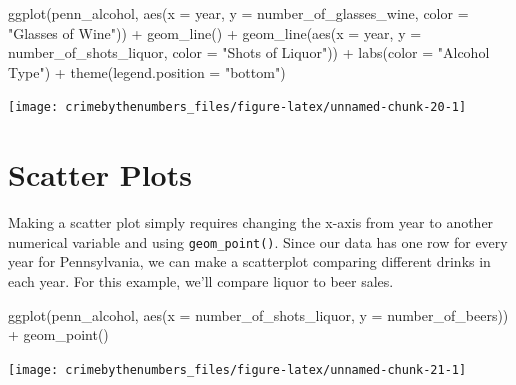 \documentclass[
]{krantz}
\makeatletter
\newenvironment{Shaded}{\begin{snugshade}}{\end{snugshade}}
\newcommand{\AttributeTok}[1]{\textcolor[rgb]{0.61,0.61,0.61}{#1}}
\newcommand{\FunctionTok}[1]{\textcolor[rgb]{0,0,0}{#1}}
\newcommand{\NormalTok}[1]{#1}
\newcommand{\SpecialCharTok}[1]{\textcolor[rgb]{0,0,0}{#1}}
\newcommand{\StringTok}[1]{\textcolor[rgb]{0.5,0.5,0.5}{#1}}
\newenvironment{kframe}{%
\medskip{}
\setlength{\fboxsep}{.8em}
 \def\at@end@of@kframe{}%
 \ifinner\ifhmode%
  \def\at@end@of@kframe{\end{minipage}}%
  \begin{minipage}{\columnwidth}%
 \fi\fi%
 \def\FrameCommand##1{\hskip\@totalleftmargin \hskip-\fboxsep
 \colorbox{shadecolor}{##1}\hskip-\fboxsep
     \hskip-\linewidth \hskip-\@totalleftmargin \hskip\columnwidth}%
 \MakeFramed {\advance\hsize-\width
   \@totalleftmargin\z@ \linewidth\hsize
   \@setminipage}}%
 {\par\unskip\endMakeFramed%
 \at@end@of@kframe}
\renewenvironment{Shaded}{\begin{kframe}}{\end{kframe}}
\makeatother
\begin{document}
\begin{Shaded}
\begin{Highlighting}[]
\FunctionTok{ggplot}\NormalTok{(penn\_alcohol, }\FunctionTok{aes}\NormalTok{(}\AttributeTok{x =}\NormalTok{ year, }\AttributeTok{y =}\NormalTok{ number\_of\_glasses\_wine,}
                         \AttributeTok{color =} \StringTok{"Glasses of Wine"}\NormalTok{)) }\SpecialCharTok{+}
  \FunctionTok{geom\_line}\NormalTok{() }\SpecialCharTok{+}
  \FunctionTok{geom\_line}\NormalTok{(}\FunctionTok{aes}\NormalTok{(}\AttributeTok{x =}\NormalTok{ year, }\AttributeTok{y =}\NormalTok{ number\_of\_shots\_liquor,}
                \AttributeTok{color =} \StringTok{"Shots of Liquor"}\NormalTok{)) }\SpecialCharTok{+}
  \FunctionTok{labs}\NormalTok{(}\AttributeTok{color =} \StringTok{"Alcohol Type"}\NormalTok{) }\SpecialCharTok{+}
  \FunctionTok{theme}\NormalTok{(}\AttributeTok{legend.position =} \StringTok{"bottom"}\NormalTok{)}
\end{Highlighting}
\end{Shaded}

\begin{center}\texttt{[image: crimebythenumbers\_files/figure-latex/unnamed-chunk-20-1]} \end{center}

\hypertarget{scatter-plots}{%
\section{Scatter Plots}\label{scatter-plots}}

Making a scatter plot simply requires changing the x-axis from year to another numerical variable and using \texttt{geom\_point()}. Since our data has one row for every year for Pennsylvania, we can make a scatterplot comparing different drinks in each year. For this example, we'll compare liquor to beer sales.

\begin{Shaded}
\begin{Highlighting}[]
\FunctionTok{ggplot}\NormalTok{(penn\_alcohol, }\FunctionTok{aes}\NormalTok{(}\AttributeTok{x =}\NormalTok{ number\_of\_shots\_liquor,}
                         \AttributeTok{y =}\NormalTok{ number\_of\_beers)) }\SpecialCharTok{+}
  \FunctionTok{geom\_point}\NormalTok{()}
\end{Highlighting}
\end{Shaded}

\begin{center}\texttt{[image: crimebythenumbers\_files/figure-latex/unnamed-chunk-21-1]} \end{center}
\end{document}
